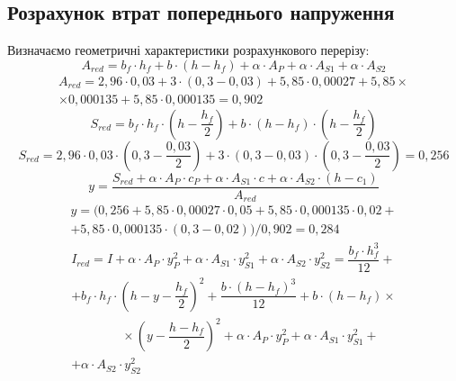 \documentclass[a4paper,14pt]{article}
\begin{document}
\subsection{Розрахунок втрат попереднього напруження}
Визначаємо геометричні характеристики розрахункового перерізу:
\begin{equation}
    A_{red} = b_f \cdot h_f + b \cdot (h - h_f) + \alpha \cdot A_P + \alpha \cdot A_{S1} + \alpha \cdot A_{S2}
\end{equation}
\begin{multline*}
    A_{red} = 2,96 \cdot 0,03 + 3 \cdot (0,3 - 0,03) + 5,85 \cdot 0,00027 + 5,85 \times \\ \times 0,000135 + 5,85 \cdot 0,000135 = 0,902
\end{multline*}
\begin{equation}
    S_{red} = b_f \cdot h_f \cdot \left(h - \dfrac{h_f}{2}\right) + b \cdot (h - h_f) \cdot \left(h - \dfrac{h_f}{2}\right)
\end{equation}
$$S_{red} = 2,96 \cdot 0,03 \cdot \left(0,3 - \dfrac{0,03}{2}\right) + 3 \cdot (0,3 - 0,03) \cdot \left(0,3 - \dfrac{0,03}{2}\right) = 0,256$$
\begin{equation}
    y = \dfrac{S_{red} + \alpha \cdot A_P \cdot c_P + \alpha \cdot A_{S1} \cdot c + \alpha \cdot A_{S2} \cdot (h - c_1)}{A_{red}}
\end{equation}
\begin{multline*}
    y = (0,256 + 5,85 \cdot 0,00027 \cdot 0,05 + 5,85 \cdot 0,000135 \cdot 0,02 + \\ + 5,85 \cdot 0,000135 \cdot (0,3 - 0,02))/0,902 = 0,284
\end{multline*}
\begin{multline}
    I_{red} = I + \alpha \cdot A_P \cdot y_P^2 + \alpha \cdot A_{S1} \cdot y_{S1}^2 + \alpha \cdot A_{S2} \cdot y_{S2}^2 = \dfrac{b_f \cdot h_f^3}{12} +\\+ b_f \cdot h_f \cdot \left(h - y - \dfrac{h_f}{2}\right)^2 + \dfrac{b \cdot (h - h_f)^3}{12} + b \cdot (h - h_f) \times \\ \qquad \qquad \times \left(y - \dfrac{h -h_f}{2}\right)^2 + \alpha \cdot A_P \cdot y_P^2 + \alpha \cdot A_{S1} \cdot y_{S1}^2 +\\+ \alpha \cdot A_{S2} \cdot y_{S2}^2
\end{multline}
\end{document}
